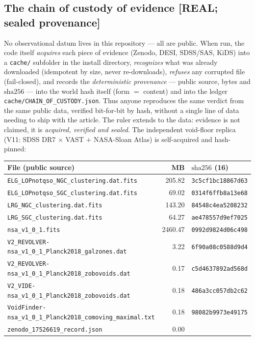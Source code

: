 \documentclass[11pt]{article}
\theoremstyle{definition}\newtheorem{deriv}{Derivation}
\begin{document}

\subsection*{The chain of custody of evidence \textsf{[REAL; sealed provenance]}}

No observational datum lives in this repository --- all are public. When run, the code itself \emph{acquires} each piece of evidence (Zenodo, DESI, SDSS/SAS, KiDS) into a \texttt{cache/} subfolder in the install directory, \emph{recognizes} what was already downloaded (idempotent by size, never re-downloads), \emph{refuses} any corrupted file (fail-closed), and records the \emph{deterministic provenance} --- public source, bytes and $\mathrm{sha}256$ --- into the world hash itself (form $=$ content) and into the ledger \texttt{cache/CHAIN\_OF\_CUSTODY.json}. Thus anyone reproduces the same verdict from the same public data, verified bit-for-bit by hash, without a single line of data needing to ship with the article. The ruler extends to the data: evidence is not claimed, it is \emph{acquired, verified and sealed}. The independent void-floor replica (V11: SDSS DR7 $\times$ VAST $+$ NASA-Sloan Atlas) is self-acquired and hash-pinned:

\begin{center}\footnotesize\begin{longtable}{@{}p{}rl@{}}\toprule File (public source) & MB & $\mathrm{sha}256$ (16) \\ \midrule\endhead \texttt{ELG\_LOPnotqso\_NGC\_clustering.dat.fits} & 205.82 & \texttt{3c5cf1bc18867d63} \\  \texttt{ELG\_LOPnotqso\_SGC\_clustering.dat.fits} & 69.02 & \texttt{0314f6ffb8a13e68} \\  \texttt{LRG\_NGC\_clustering.dat.fits} & 143.20 & \texttt{84548c4ea5208232} \\  \texttt{LRG\_SGC\_clustering.dat.fits} & 64.27 & \texttt{ae478557d9ef7025} \\  \texttt{nsa\_v1\_0\_1.fits} & 2460.47 & \texttt{0992d9824d06c498} \\  \texttt{V2\_REVOLVER-nsa\_v1\_0\_1\_Planck2018\_galzones.dat} & 3.22 & \texttt{6f90a08c0588d9d4} \\  \texttt{V2\_REVOLVER-nsa\_v1\_0\_1\_Planck2018\_zobovoids.dat} & 0.17 & \texttt{c5d4637892ad568d} \\  \texttt{V2\_VIDE-nsa\_v1\_0\_1\_Planck2018\_zobovoids.dat} & 0.18 & \texttt{486a3cc057db2c62} \\  \texttt{VoidFinder-nsa\_v1\_0\_1\_Planck2018\_comoving\_maximal.txt} & 0.18 & \texttt{98082b9973e49175} \\  \texttt{zenodo\_17526619\_record.json} & 0.00 & \texttt{} \\ \bottomrule\end{longtable}\end{center}
\end{document}
